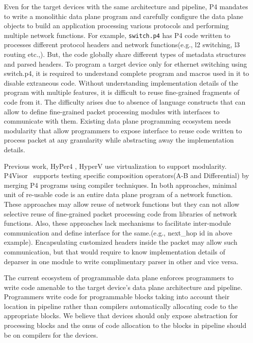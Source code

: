 Even for the target devices with the same architecture and pipeline, P4 mandates to write a monolithic data plane program and carefully configure the data plane objects to build an application processing various protocols and performing multiple network functions.
For example, \texttt{switch.p4} \cite{switch.p4} has P4 code written to processes different protocol headers and network functions(e.g., l2 switching, l3 routing etc.,). 
But, the code globally share different types of metadata structures and parsed headers.
To program a target device only for ethernet switching using switch.p4, it is required to understand complete program and macros used in it to disable extraneous code.
Without understanding implementation details of the program with multiple features, it is difficult to reuse fine-grained fragments of code from it.
The difficulty arises due to absence of language constructs that can allow to define fine-grained packet processing modules with interfaces to communicate with them.
Existing data plane programming ecosystem needs modularity that allow programmers to expose interface to reuse code written to process packet at any granularity while abstracting away the implementation details.




Previous work, HyPer4 \cite{Hancock:2016:HUP:2999572.2999607}, HyperV \cite{8038396} use virtualization to support modularity.
P4Visor~\cite{Zheng:2018:PLV:3281411.3281436} supports testing specific composition operators(A-B and Differential) by merging P4 programs using compiler techniques.
In both approaches, minimal unit of re-usable code is an entire data plane program of a network function. 
These approaches may allow reuse of network functions but they can not allow selective reuse of fine-grained packet processing code from libraries of network functions.
Also, these approaches lack mechanisms to facilitate inter-module communication and define interface for the same.(e.g., next\_hop id in above example).
Encapsulating customized headers inside the packet may allow such communication, but that would require to know implementation details of deparser in one module to write complimentary parser in other and vice versa. 


The current ecosystem of programmable data plane enforces programmers to write code amenable to the target device's data plane architecture and pipeline.
Programmers write code for programmable blocks taking into account their location in pipeline rather than compilers automatically allocating code to the appropriate blocks.
We believe that devices should only expose abstraction for processing blocks and the onus of code allocation to the blocks in pipeline should be on compilers for the devices.

